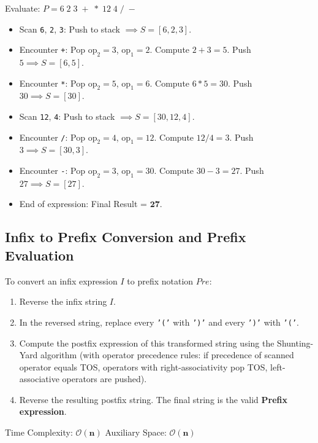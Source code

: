 \documentclass[12pt,a4paper]{article}
\begin{document}
\begin{tcolorbox}[examplebox, title={\textbf{Evaluation Trace: Numerical Postfix String}}]
Evaluate: $P = 6 \; 2 \; 3 \; + \; * \; 12 \; 4 \; / \; -$
\begin{itemize}[leftmargin=*, itemsep=2pt]
  \item Scan \texttt{6}, \texttt{2}, \texttt{3}: Push to stack $\implies S = [6, 2, 3]$.
  \item Encounter \texttt{+}: Pop $\text{op}_2 = 3$, $\text{op}_1 = 2$. Compute $2 + 3 = 5$. Push $5 \implies S = [6, 5]$.
  \item Encounter \texttt{*}: Pop $\text{op}_2 = 5$, $\text{op}_1 = 6$. Compute $6 * 5 = 30$. Push $30 \implies S = [30]$.
  \item Scan \texttt{12}, \texttt{4}: Push to stack $\implies S = [30, 12, 4]$.
  \item Encounter \texttt{/}: Pop $\text{op}_2 = 4$, $\text{op}_1 = 12$. Compute $12 / 4 = 3$. Push $3 \implies S = [30, 3]$.
  \item Encounter \texttt{-}: Pop $\text{op}_2 = 3$, $\text{op}_1 = 30$. Compute $30 - 3 = 27$. Push $27 \implies S = [27]$.
  \item End of expression: Final Result = $\mathbf{27}$.
\end{itemize}
\end{tcolorbox}

\subsection{Infix to Prefix Conversion and Prefix Evaluation}
\begin{tcolorbox}[defbox, title={\textbf{Infix to Prefix Conversion Algorithm (Reversal Method)}}]
To convert an infix expression $I$ to prefix notation $Pre$:
\begin{enumerate}[leftmargin=*, nosep]
  \item Reverse the infix string $I$.
  \item In the reversed string, replace every \texttt{'('} with \texttt{')'} and every \texttt{')'} with \texttt{'('}.
  \item Compute the postfix expression of this transformed string using the Shunting-Yard algorithm (with operator precedence rules: if precedence of scanned operator equals TOS, operators with right-associativity pop TOS, left-associative operators are pushed).
  \item Reverse the resulting postfix string. The final string is the valid \textbf{Prefix expression}.
\end{enumerate}
Time Complexity: $\mathbf{\mathcal{O}(n)}$ \quad Auxiliary Space: $\mathbf{\mathcal{O}(n)}$
\end{tcolorbox}
\end{document}
